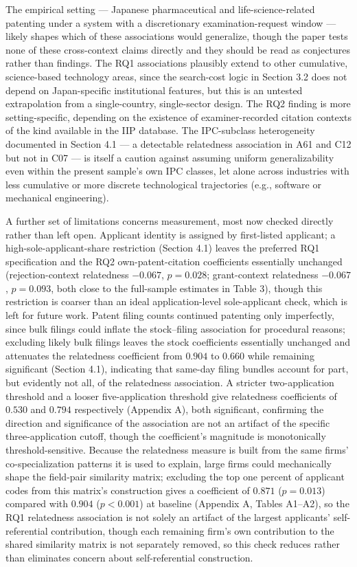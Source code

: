 \documentclass[12pt]{article}
\begin{document}
The empirical setting --- Japanese pharmaceutical and life-science-related patenting under a system with a discretionary examination-request window --- likely shapes which of these associations would generalize, though the paper tests none of these cross-context claims directly and they should be read as conjectures rather than findings. The RQ1 associations plausibly extend to other cumulative, science-based technology areas, since the search-cost logic in Section 3.2 does not depend on Japan-specific institutional features, but this is an untested extrapolation from a single-country, single-sector design. The RQ2 finding is more setting-specific, depending on the existence of examiner-recorded citation contexts of the kind available in the IIP database. The IPC-subclass heterogeneity documented in Section 4.1 --- a detectable relatedness association in A61 and C12 but not in C07 --- is itself a caution against assuming uniform generalizability even within the present sample's own IPC classes, let alone across industries with less cumulative or more discrete technological trajectories (e.g., software or mechanical engineering).

A further set of limitations concerns measurement, most now checked directly rather than left open. Applicant identity is assigned by first-listed applicant; a high-sole-applicant-share restriction (Section 4.1) leaves the preferred RQ1 specification and the RQ2 own-patent-citation coefficients essentially unchanged (rejection-context relatedness $-0.067$, $p=0.028$; grant-context relatedness $-0.067$, $p=0.093$, both close to the full-sample estimates in Table 3), though this restriction is coarser than an ideal application-level sole-applicant check, which is left for future work. Patent filing counts continued patenting only imperfectly, since bulk filings could inflate the stock--filing association for procedural reasons; excluding likely bulk filings leaves the stock coefficients essentially unchanged and attenuates the relatedness coefficient from $0.904$ to $0.660$ while remaining significant (Section 4.1), indicating that same-day filing bundles account for part, but evidently not all, of the relatedness association. A stricter two-application threshold and a looser five-application threshold give relatedness coefficients of $0.530$ and $0.794$ respectively (Appendix A), both significant, confirming the direction and significance of the association are not an artifact of the specific three-application cutoff, though the coefficient's magnitude is monotonically threshold-sensitive. Because the relatedness measure is built from the same firms' co-specialization patterns it is used to explain, large firms could mechanically shape the field-pair similarity matrix; excluding the top one percent of applicant codes from this matrix's construction gives a coefficient of $0.871$ ($p=0.013$) compared with $0.904$ ($p<0.001$) at baseline (Appendix A, Tables A1--A2), so the RQ1 relatedness association is not solely an artifact of the largest applicants' self-referential contribution, though each remaining firm's own contribution to the shared similarity matrix is not separately removed, so this check reduces rather than eliminates concern about self-referential construction.
\end{document}
